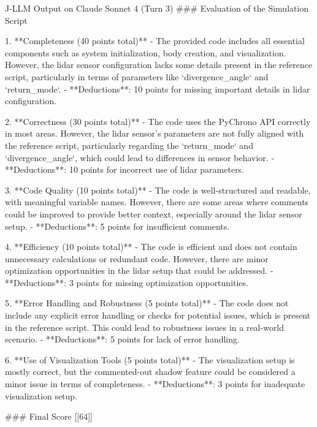       \begin{PromptBlock}{J-LLM Output on Claude Sonnet 4 (Turn 3)}
      ### Evaluation of the Simulation Script
      
      1. **Completeness (40 points total)**
         - The provided code includes all essential components such as system initialization, body creation, and visualization. However, the lidar sensor configuration lacks some details present in the reference script, particularly in terms of parameters like `divergence_angle` and `return_mode`. 
         - **Deductions**: 10 points for missing important details in lidar configuration.
      
      2. **Correctness (30 points total)**
         - The code uses the PyChrono API correctly in most areas. However, the lidar sensor's parameters are not fully aligned with the reference script, particularly regarding the `return_mode` and `divergence_angle`, which could lead to differences in sensor behavior.
         - **Deductions**: 10 points for incorrect use of lidar parameters.
      
      3. **Code Quality (10 points total)**
         - The code is well-structured and readable, with meaningful variable names. However, there are some areas where comments could be improved to provide better context, especially around the lidar sensor setup.
         - **Deductions**: 5 points for insufficient comments.
      
      4. **Efficiency (10 points total)**
         - The code is efficient and does not contain unnecessary calculations or redundant code. However, there are minor optimization opportunities in the lidar setup that could be addressed.
         - **Deductions**: 3 points for missing optimization opportunities.
      
      5. **Error Handling and Robustness (5 points total)**
         - The code does not include any explicit error handling or checks for potential issues, which is present in the reference script. This could lead to robustness issues in a real-world scenario.
         - **Deductions**: 5 points for lack of error handling.
      
      6. **Use of Visualization Tools (5 points total)**
         - The visualization setup is mostly correct, but the commented-out shadow feature could be considered a minor issue in terms of completeness.
         - **Deductions**: 3 points for inadequate visualization setup.
      
      ### Final Score
      [[64]]
      \end{PromptBlock}